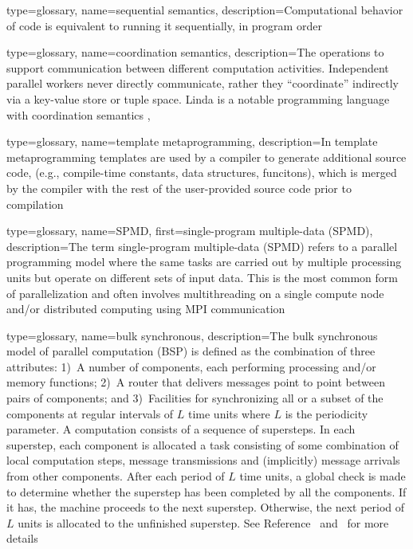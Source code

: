 {
  type=glossary,
  name={sequential semantics},
  description={Computational behavior of code is equivalent to running it
    sequentially, in program order}
}

{
  type=glossary,
  name={coordination semantics},
  description={The operations to support communication between different
    computation activities. Independent parallel workers never directly
      communicate, rather they ``coordinate'' indirectly via a \gls{key-value
        store} or \gls{tuple space}. \gls{Linda} is a notable \gls{programming
        language} with coordination semantics
  },
}


{
  type=glossary,
  name={template metaprogramming},
  description={In template metaprogramming templates are used by a compiler to
    generate additional source code, (e.g., compile-time constants, data
        structures, funcitons), which is merged by the compiler with the rest
      of the user-provided source code prior to compilation} 
}

{
  type=glossary,
  name={SPMD},
  first={single-program multiple-data (SPMD)},
  description={The term single-program multiple-data (SPMD) refers to a parallel \gls{programming model} where the same tasks are carried out by multiple processing units but operate on different sets of input data. This is the most common form of parallelization and often involves multithreading on a single compute node and/or distributed computing using \gls{MPI} communication}
}




{
  type=glossary,
  name={bulk synchronous},
  description={The bulk synchronous model of parallel computation (BSP) is
  defined as the combination of three attributes: 1)~A number of
  components, each performing processing and/or memory functions; 2)~A
  router that delivers messages point to point between pairs of
  components; and 3)~Facilities for synchronizing all or a subset of
  the components at regular intervals of $L$ time units where $L$ is
  the periodicity parameter.  A computation consists of a sequence of
  supersteps. In each superstep, each component is allocated a task
  consisting of some combination of local computation steps, message
  transmissions and (implicitly) message arrivals from other
  components. After each period of $L$ time units, a global check is
  made to determine whether the superstep has been completed by all
  the components. If it has, the machine proceeds to the next
  superstep. Otherwise, the next period of $L$ units is allocated to
  the unfinished superstep.  See Reference~\cite{BSP}
  and~\cite{wikiBSP} for more details} 
}


